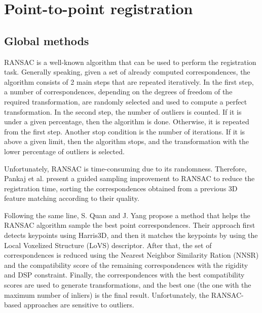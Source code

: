     \section{Point-to-point registration}
        \subsection{Global methods}

        RANSAC \cite{Fischler_1981_RANSAC} is a well-known algorithm that can be used to perform the registration task. 
        Generally speaking, given a set of already computed correspondences, the algorithm consists of 2 main steps that are repeated iteratively. 
        In the first step, a number of correspondences, depending on the degrees of freedom of the required transformation, 
        are randomly selected and used to compute a perfect transformation. 
        In the second step, the number of outliers is counted. 
        If it is under a given percentage, then the algorithm is done. Otherwise, it is repeated from the first step. 
        Another stop condition is the number of iterations. 
        If it is above a given limit, then the algorithm stops, and the transformation with the lower percentage of outliers is selected.
        
        Unfortunately, RANSAC is time-consuming due to its randomness.
        Therefore, Pankaj et al. \cite{Pankaj_2015_arobust} present a guided sampling improvement to RANSAC
        to reduce the registration time, sorting the correspondences obtained from a previous 3D feature matching according to their quality.
        
        Following the same line, S. Quan and J. Yang \cite{Quan_2020_com} propose a method that helps the RANSAC algorithm 
        sample the best point correspondences. Their approach first detects keypoints using Harris3D, and then it matches the keypoints
        by using the Local Voxelized Structure (LoVS) descriptor. After that, the set of correspondences is reduced using the 
        Nearest Neighbor Similarity Ration (NNSR) and the compatibility score of the remaining correspondences with the rigidity and 
        DSP constraint. Finally, the correspondences with the best compatibility scores are used to generate transformations,
        and the best one (the one with the maximum number of inliers) is the final result. Unfortunately, the RANSAC-based approaches are sensitive to outliers.

